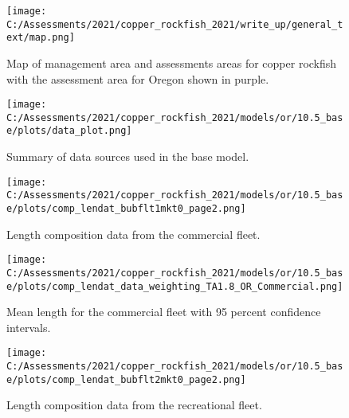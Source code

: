 \documentclass[11pt,
  english,
  a4paper,
]{article}
\begin{document}

\begin{figure}
\centering
\texttt{[image: C:/Assessments/2021/copper\_rockfish\_2021/write\_up/general\_text/map.png]}
\caption{Map of management area and assessments areas for copper rockfish with the assessment area for Oregon shown in purple.\label{fig:map}}
\end{figure}

\tagmcend\tagstructend


\begin{figure}
\centering
\texttt{[image: C:/Assessments/2021/copper\_rockfish\_2021/models/or/10.5\_base/plots/data\_plot.png]}
\caption{Summary of data sources used in the base model.\label{fig:data-plot}}
\end{figure}

\tagmcend\tagstructend


\begin{figure}
\centering
\texttt{[image: C:/Assessments/2021/copper\_rockfish\_2021/models/or/10.5\_base/plots/comp\_lendat\_bubflt1mkt0\_page2.png]}
\caption{Length composition data from the commercial fleet.\label{fig:com-len-data}}
\end{figure}

\tagmcend\tagstructend


\begin{figure}
\centering
\texttt{[image: C:/Assessments/2021/copper\_rockfish\_2021/models/or/10.5\_base/plots/comp\_lendat\_data\_weighting\_TA1.8\_OR\_Commercial.png]}
\caption{Mean length for the commercial fleet with 95 percent confidence intervals.\label{fig:mean-com-len-data}}
\end{figure}

\tagmcend\tagstructend


\begin{figure}
\centering
\texttt{[image: C:/Assessments/2021/copper\_rockfish\_2021/models/or/10.5\_base/plots/comp\_lendat\_bubflt2mkt0\_page2.png]}
\caption{Length composition data from the recreational fleet.\label{fig:rec-len-data}}
\end{figure}
\end{document}

